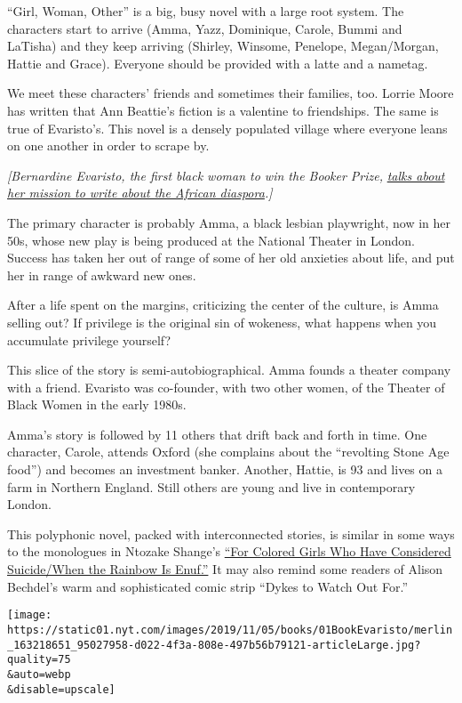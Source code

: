 ``Girl, Woman, Other'' is a big, busy novel with a large root system.
The characters start to arrive (Amma, Yazz, Dominique, Carole, Bummi and
LaTisha) and they keep arriving (Shirley, Winsome, Penelope,
Megan/Morgan, Hattie and Grace). Everyone should be provided with a
latte and a nametag.

We meet these characters' friends and sometimes their families, too.
Lorrie Moore has written that Ann Beattie's fiction is a valentine to
friendships. The same is true of Evaristo's. This novel is a densely
populated village where everyone leans on one another in order to scrape
by.

\emph{{[}Bernardine Evaristo, the first black woman to win the Booker
Prize,}
\href{https://www.nytimes.com/2019/11/01/books/bernardine-evaristo-girl-woman-other-booker-prize.html}{\emph{talks
about her mission to write about the African diaspora}}\emph{.{]}}

The primary character is probably Amma, a black lesbian playwright, now
in her 50s, whose new play is being produced at the National Theater in
London. Success has taken her out of range of some of her old anxieties
about life, and put her in range of awkward new ones.

After a life spent on the margins, criticizing the center of the
culture, is Amma selling out? If privilege is the original sin of
wokeness, what happens when you accumulate privilege yourself?

This slice of the story is semi-autobiographical. Amma founds a theater
company with a friend. Evaristo was co-founder, with two other women, of
the Theater of Black Women in the early 1980s.

Amma's story is followed by 11 others that drift back and forth in time.
One character, Carole, attends Oxford (she complains about the
``revolting Stone Age food'') and becomes an investment banker. Another,
Hattie, is 93 and lives on a farm in Northern England. Still others are
young and live in contemporary London.

This polyphonic novel, packed with interconnected stories, is similar in
some ways to the monologues in Ntozake Shange's
\href{https://www.nytimes.com/2019/10/22/theater/for-colored-girls-review-ntozake-shange.html}{``For
Colored Girls Who Have Considered Suicide/When the Rainbow Is Enuf.''}
It may also remind some readers of Alison Bechdel's warm and
sophisticated comic strip ``Dykes to Watch Out For.''

\texttt{[image: https://static01.nyt.com/images/2019/11/05/books/01BookEvaristo/merlin\_163218651\_95027958-d022-4f3a-808e-497b56b79121-articleLarge.jpg?quality=75\\\&auto=webp\\\&disable=upscale]}

